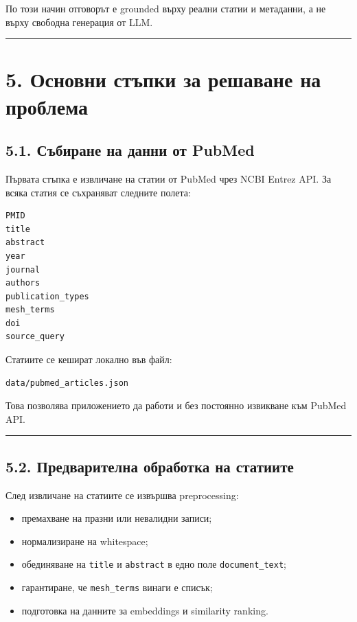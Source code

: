 \documentclass[12pt,a4paper]{article}
\providecommand{\tightlist}{\setlength{\itemsep}{0pt}\setlength{\parskip}{0pt}}
\begin{document}
По този начин отговорът е grounded върху реални статии и метаданни, а не върху свободна генерация от LLM.

\vspace{0.5em}\hrule\vspace{1.0em}

\section{5. Основни стъпки за решаване на проблема}\label{ux43eux441ux43dux43eux432ux43dux438-ux441ux442ux44aux43fux43aux438-ux437ux430-ux440ux435ux448ux430ux432ux430ux43dux435-ux43dux430-ux43fux440ux43eux431ux43bux435ux43cux430}

\subsection{5.1. Събиране на данни от PubMed}\label{ux441ux44aux431ux438ux440ux430ux43dux435-ux43dux430-ux434ux430ux43dux43dux438-ux43eux442-pubmed}

Първата стъпка е извличане на статии от PubMed чрез NCBI Entrez API. За всяка статия се съхраняват следните полета:

\begin{verbatim}
PMID
title
abstract
year
journal
authors
publication_types
mesh_terms
doi
source_query
\end{verbatim}

Статиите се кешират локално във файл:

\begin{verbatim}
data/pubmed_articles.json
\end{verbatim}

Това позволява приложението да работи и без постоянно извикване към PubMed API.

\vspace{0.5em}\hrule\vspace{1.0em}

\subsection{5.2. Предварителна обработка на статиите}\label{ux43fux440ux435ux434ux432ux430ux440ux438ux442ux435ux43bux43dux430-ux43eux431ux440ux430ux431ux43eux442ux43aux430-ux43dux430-ux441ux442ux430ux442ux438ux438ux442ux435}

След извличане на статиите се извършва preprocessing:

\begin{itemize}
\tightlist
\item
  премахване на празни или невалидни записи;
\item
  нормализиране на whitespace;
\item
  обединяване на \texttt{title} и \texttt{abstract} в едно поле \texttt{document\_text};
\item
  гарантиране, че \texttt{mesh\_terms} винаги е списък;
\item
  подготовка на данните за embeddings и similarity ranking.
\end{itemize}
\end{document}
